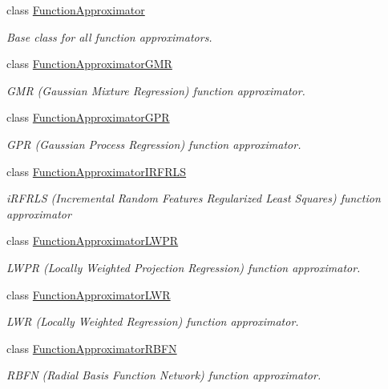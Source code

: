 \begin{DoxyCompactItemize}
\item 
class \hyperlink{classDmpBbo_1_1FunctionApproximator}{Function\+Approximator}
\begin{DoxyCompactList}\small\item\em Base class for all function approximators. \end{DoxyCompactList}\item 
class \hyperlink{classDmpBbo_1_1FunctionApproximatorGMR}{Function\+Approximator\+G\+M\+R}
\begin{DoxyCompactList}\small\item\em G\+M\+R (Gaussian Mixture Regression) function approximator. \end{DoxyCompactList}\item 
class \hyperlink{classDmpBbo_1_1FunctionApproximatorGPR}{Function\+Approximator\+G\+P\+R}
\begin{DoxyCompactList}\small\item\em G\+P\+R (Gaussian Process Regression) function approximator. \end{DoxyCompactList}\item 
class \hyperlink{classDmpBbo_1_1FunctionApproximatorIRFRLS}{Function\+Approximator\+I\+R\+F\+R\+L\+S}
\begin{DoxyCompactList}\small\item\em i\+R\+F\+R\+L\+S (Incremental Random Features Regularized Least Squares) function approximator \end{DoxyCompactList}\item 
class \hyperlink{classDmpBbo_1_1FunctionApproximatorLWPR}{Function\+Approximator\+L\+W\+P\+R}
\begin{DoxyCompactList}\small\item\em L\+W\+P\+R (Locally Weighted Projection Regression) function approximator. \end{DoxyCompactList}\item 
class \hyperlink{classDmpBbo_1_1FunctionApproximatorLWR}{Function\+Approximator\+L\+W\+R}
\begin{DoxyCompactList}\small\item\em L\+W\+R (Locally Weighted Regression) function approximator. \end{DoxyCompactList}\item 
class \hyperlink{classDmpBbo_1_1FunctionApproximatorRBFN}{Function\+Approximator\+R\+B\+F\+N}
\begin{DoxyCompactList}\small\item\em R\+B\+F\+N (Radial Basis Function Network) function approximator. \end{DoxyCompactList}\item 

\end{DoxyCompactItemize}
